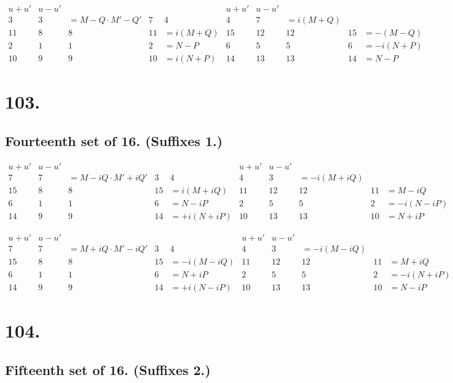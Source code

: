 \documentclass[11pt,a4paper]{book}
\begin{document}
\[
\begin{array}{c|cccc|c|cccc}
u+u' & u-u' & & & & u+u' & u-u' & & & \\
\hline
3 & 3 & = M-Q \cdot M'-Q' & 7 & 4 & 4 & 7 & = i(M+Q) \\
11 & 8 & 8 & 11 & = i(M+Q) & 15 & 12 & 12 & 15 & = -(M-Q) \\
2 & 1 & 1 & 2 & = N-P & 6 & 5 & 5 & 6 & = -i(N+P) \\
10 & 9 & 9 & 10 & = i(N+P) & 14 & 13 & 13 & 14 & = N-P
\end{array}
\]

\newpage
\section*{103.}
\label{sec:103}

\subsection*{Fourteenth set of 16. (Suffixes 1.)}

\[
\begin{array}{c|cccc|c|cccc}
u+u' & u-u' & & & & u+u' & u-u' & & & \\
\hline
7 & 7 & = M-iQ \cdot M'+iQ' & 3 & 4 & 4 & 3 & = -i(M+iQ) \\
15 & 8 & 8 & 15 & = i(M+iQ) & 11 & 12 & 12 & 11 & = M-iQ \\
6 & 1 & 1 & 6 & = N-iP & 2 & 5 & 5 & 2 & = -i(N-iP) \\
14 & 9 & 9 & 14 & = +i(N+iP) & 10 & 13 & 13 & 10 & = N+iP
\end{array}
\]

\[
\begin{array}{c|cccc|c|cccc}
u+u' & u-u' & & & & u+u' & u-u' & & & \\
\hline
7 & 7 & = M+iQ \cdot M'-iQ' & 3 & 4 & 4 & 3 & = -i(M-iQ) \\
15 & 8 & 8 & 15 & = -i(M-iQ) & 11 & 12 & 12 & 11 & = M+iQ \\
6 & 1 & 1 & 6 & = N+iP & 2 & 5 & 5 & 2 & = -i(N+iP) \\
14 & 9 & 9 & 14 & = +i(N-iP) & 10 & 13 & 13 & 10 & = N-iP
\end{array}
\]

\newpage
\section*{104.}
\label{sec:104}

\subsection*{Fifteenth set of 16. (Suffixes 2.)}
\end{document}
